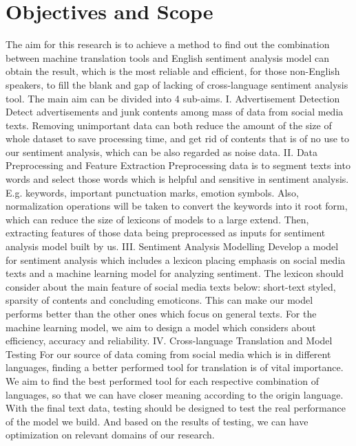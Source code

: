 \documentclass[conference,compsoc]{IEEEtran}
\begin{document}
\section{Objectives and Scope}
The aim for this research is to achieve a method to find out the combination between machine translation tools and English sentiment analysis model can obtain the result, which is the most reliable and efficient, for those non-English speakers, to fill the blank and gap of lacking of cross-language sentiment analysis tool. The main aim can be divided into 4 sub-aims.
I.	Advertisement Detection Detect advertisements and junk contents among mass of data from social media texts. Removing unimportant data can both reduce the amount of the size of whole dataset to save processing time, and get rid of contents that is of no use to our sentiment analysis, which can be also regarded as noise data.
II.	Data Preprocessing and Feature Extraction Preprocessing data is to segment texts into words and select those words which is helpful and sensitive in sentiment analysis. E.g. keywords, important punctuation marks, emotion symbols. Also, normalization operations will be taken to convert the keywords into it root form, which can reduce the size of lexicons of models to a large extend. Then, extracting features of those data being preprocessed as inputs for sentiment analysis model built by us.
III.	Sentiment Analysis Modelling Develop a model for sentiment analysis which includes a lexicon placing emphasis on social media texts and a machine learning model for analyzing sentiment. The lexicon should consider about the main feature of social media texts below: short-text styled, sparsity of contents and concluding emoticons. This can make our model performs better than the other ones which focus on general texts. For the machine learning model, we aim to design a model which considers about efficiency, accuracy and reliability.
IV.	Cross-language Translation and Model Testing For our source of data coming
from social media which is in different languages, finding a better performed
tool for translation is of vital importance. We aim to find the best performed
tool for each respective combination of languages, so that we can have closer
meaning according to the origin language. With the final text data, testing
should be designed to test the real performance of the model we build. And based
on the results of testing, we can have optimization on relevant domains of our
research.
\end{document}
